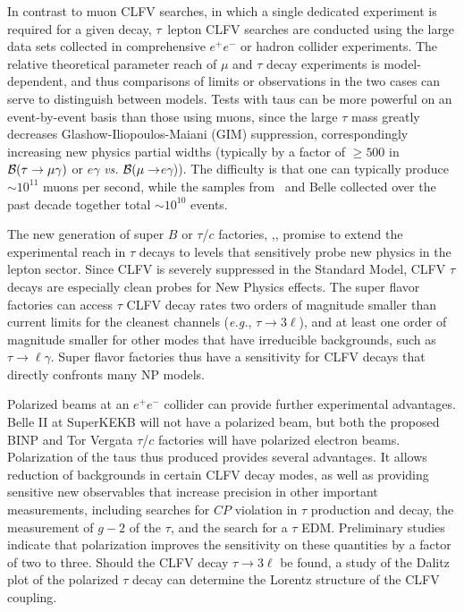 In contrast to muon CLFV searches, in which a single dedicated experiment is required for a given decay,  $\tau$~lepton CLFV searches are conducted using the large data sets collected in comprehensive $e^+e^-$ or hadron collider experiments. The relative theoretical parameter reach of $\mu$ and $\tau$ decay experiments is model-dependent, and thus comparisons of limits or observations in the two cases can serve to distinguish between models.
Tests with taus can be more powerful on an event-by-event basis than those using muons, since the large $\tau$ mass greatly decreases 
Glashow-Iliopoulos-Maiani (GIM) suppression, correspondingly increasing new physics partial widths (typically by a factor of $\geq 500$ in $\cal{B}(\tau \rightarrow \mu \gamma)$ or $e \gamma$ {\it vs.} $\cal{B}(\mu \rightarrow$$e \gamma$)).  The difficulty is that one can typically produce $\sim 10^{11}$ muons per second, while the samples from \babar\ and Belle collected over the past decade together total $\sim 10^{10}$ events.  

The new generation of super $B$ or $\tau$/$c$ factories, \cite{superkekb},\cite{Blinov:2009zzd},\cite{tc} promise to extend the
experimental reach in $\tau$ decays to levels that sensitively
probe new physics in the lepton sector. Since CLFV is severely suppressed in the Standard Model, CLFV $\tau$ decays
are especially clean probes for New Physics
effects.  The
super flavor factories can access $\tau$ CLFV decay rates two orders of magnitude smaller than current limits for the cleanest channels
({\it e.g.}, $\tau\to 3\ell$), and at least one order of magnitude smaller for other
modes that have irreducible backgrounds, such as $\tau\to \ell\gamma$. Super flavor factories thus have a sensitivity for CLFV decays that directly confronts many NP models. 

Polarized beams at an $e^+e^-$ collider can provide further
experimental advantages.   Belle II at \hbox{SuperKEKB} will not have a polarized beam, but both the proposed BINP and Tor Vergata $\tau$/$c$ factories will have polarized electron beams.  Polarization of the taus thus produced provides several advantages. It allows reduction of backgrounds in certain
CLFV decay modes, as well as providing sensitive new
observables that increase precision in other important measurements, including
searches for $C\!P$ violation in $\tau$ production and decay, the measurement
of $g-2$ of the $\tau$, and the search for a $\tau$ EDM.  Preliminary studies indicate that polarization improves the sensitivity on these quantities by a factor of two to three. Should the CLFV decay $\tau \rightarrow 3\ell$ be found, a study of the Dalitz plot of the polarized $\tau$ decay can determine the Lorentz structure of the CLFV coupling.

